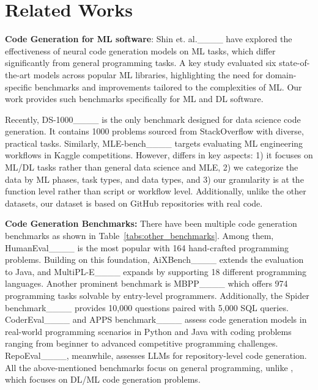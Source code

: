 \section{Related Works}
\textbf{Code Generation for ML software}: Shin et. al.____ have explored the effectiveness of neural code generation models on ML tasks, which differ significantly from general programming tasks. A key study evaluated six state-of-the-art models across popular ML libraries, highlighting the need for domain-specific benchmarks and improvements tailored to the complexities of ML. Our work provides such benchmarks specifically for ML and DL software.

Recently, DS-1000____ is the only benchmark designed for data science code generation. It contains 1000 problems sourced from 
StackOverflow with
diverse, practical tasks. Similarly, MLE-bench____ targets evaluating ML engineering workflows in Kaggle competitions.
However, \tool differs in key aspects: 1) it focuses on ML/DL tasks rather than general data science and MLE, 2) we categorize the data by ML phases, task types, and data types, and 3) our granularity is at the function level rather than script or workflow level. Additionally, unlike the other datasets, our dataset is based on GitHub repositories with real code.

\textbf{Code Generation Benchmarks: } There have been multiple code generation benchmarks as shown in Table~\ref{tabs:other_benchmarks}.
Among them, HumanEval____ is the most popular
with 164 hand-crafted programming problems.
Building on this foundation, AiXBench____ extends the evaluation to Java, and MultiPL-E____ expands
by supporting 18 different programming languages.
Another prominent benchmark is MBPP____ which offers 974 programming tasks solvable by entry-level programmers.
Additionally, the Spider benchmark____ provides 10,000 questions paired with 5,000 SQL queries. 
CoderEval____ and APPS benchmark____ assess code generation models in real-world programming scenarios in Python and Java with coding problems ranging from beginner to advanced competitive programming challenges. RepoEval____, meanwhile, assesses LLMs for repository-level code generation. All the above-mentioned benchmarks focus on general programming, unlike \tool, which focuses on DL/ML code generation problems.

